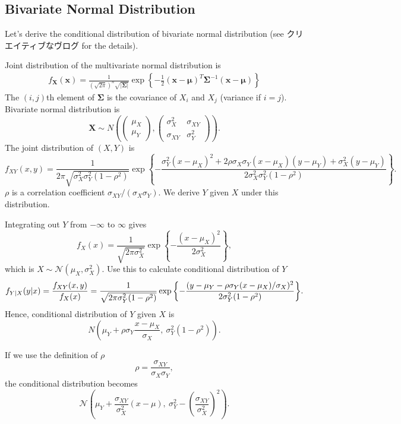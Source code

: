 \documentclass[a4paper,10.5pt,uplatex]{jsarticle}  %
\begin{document}
\subsection{Bivariate Normal Distribution}
Let's derive the conditional distribution of bivariate normal distribution (see クリエイティブなヴログ for the details).\par
Joint distribution of the multivariate normal distribution is
\begin{align}
f_{\boldsymbol X}(\boldsymbol x)=\frac{1}{(\sqrt{2\pi})^n\sqrt{|\boldsymbol\Sigma|}}\exp{\left \{ -\frac{1}{2}(\boldsymbol x-\boldsymbol\mu)^T\boldsymbol\Sigma^{-1}(\boldsymbol x-\boldsymbol\mu) \right \}}
\end{align}
The $(i,j)$th element of $\boldsymbol{\Sigma}$ is the covariance of $X_i$ and $X_j$ (variance if $i=j$). Bivariate normal distribution is $$\boldsymbol X\sim N\left ( \begin{pmatrix} \mu_X\\ \mu_Y \end{pmatrix},\begin{pmatrix} \sigma_X^2 & \sigma_{XY}\\ \sigma_{XY} & \sigma_Y^2 \end{pmatrix} \right ).$$The joint distribution of $(X,Y)$ is $$f_{XY}(x,y)=\frac{1}{2\pi\sqrt{\sigma_X^2 \sigma_Y^2(1-\rho^2)}}\exp{\left \{ -\frac{\sigma_Y^2(x-\mu_X)^2+2\rho\sigma_X\sigma_Y(x-\mu_X)(y-\mu_Y)+\sigma_X^2(y-\mu_Y)}{2\sigma_X^2 \sigma_Y^2(1-\rho^2)} \right \}}.$$ $\rho$ is a correlation coefficient $\sigma_{XY} / (\sigma_X \sigma_Y)$. We derive $Y$ given $X$ under this distribution.\par
  Integrating out $Y$ from $-\infty$ to $\infty$ gives $$f_X(x)=\frac{1}{\sqrt{2\pi\sigma_X^2}}\exp{\left \{ -\frac{(x-\mu_X)^2}{2\sigma_X^2} \right \}},$$ which is $X \sim \mathcal{N}(\mu_X, \sigma_X^2)$. Use this to calculate conditional distribution of $Y$ $$f_{Y|X}(y|x)=\frac{f_{XY}(x,y)}{f_X(x)} \\ =\frac{1}{\sqrt{2\pi\sigma_Y^2(1-\rho^2)}}\exp{\left \{ -\frac{(y-\mu_Y-\rho\sigma_Y(x-\mu_X)/\sigma_X)^2}{2\sigma_Y^2(1-\rho^2)} \right \}}.$$ Hence, conditional distribution of $Y$ given $X$ is $$N\left ( \mu_Y+\rho\sigma_Y\frac{x-\mu_X}{\sigma_X},\ \sigma_Y^2(1-\rho^2) \right ).$$\par
If we use the definition of $\rho$ $$\rho=\frac{\sigma_{XY}}{\sigma_X\sigma_Y},$$ the conditional distribution becomes \begin{equation} \mathcal{N}\left ( \mu_Y+\frac{\sigma_{XY}}{\sigma_X^2}(x-\mu),\ \sigma_Y^2-\left (\frac{\sigma_{XY}}{\sigma_X^2} \right )^2 \right ).\label{Eq:BiNorm}\end{equation}
\end{document}
